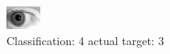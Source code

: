 \begin{figure}[h!]
\begin{center}
\includegraphics[width=0.60\columnwidth]{figures/ID185_class_4_target_3.png}
\end{center}
\caption{ Classification: 4 actual target: 3}
\label{fig:ID185_class_4_target_3}
\end{figure}
